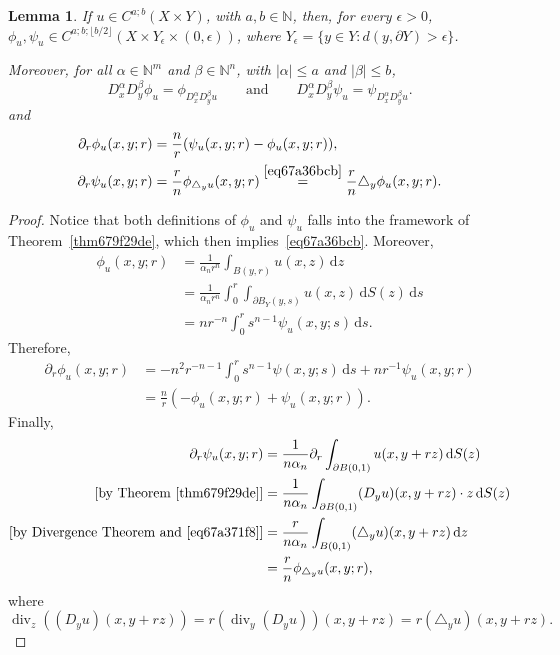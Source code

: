 \documentclass[a4paper,9pt]{amsart}
\newcommand{\N}{\mathbb{N}}	%
\newcommand{\did}{\,\mathrm{d}}	%
\newcommand{\de}{\partial}		%
\renewcommand{\div}{\operatorname{div}}	%
\newcommand{\laplacian}{\triangle}
\def\Xint#1{\mathchoice
      {\XXint\displaystyle\textstyle{#1}}%
      {\XXint\textstyle\scriptstyle{#1}}%
      {\XXint\scriptstyle\scriptscriptstyle{#1}}%
      {\XXint\scriptscriptstyle\scriptscriptstyle{#1}}%
      \!\int}
\def\XXint#1#2#3{{\setbox0=\hbox{$#1{#2#3}{\int}$}
        \vcenter{\hbox{$#2#3$}}\kern-.5\wd0}}
\def\fint{\Xint-}
\theoremstyle{plain}
\newtheorem{lemma}[proposition]{Lemma}
\theoremstyle{definition}
\theoremstyle{remark}
\begin{document}
\begin{lemma}\label{lem67cd4b64}
	If $u\in C^{a;b}(X\times Y)$, with $a,b\in\N$, then, for every $\epsilon>0$,
	$\phi_u,\psi_u \in C^{a;b;\lfloor b/2 \rfloor}(X\times Y_\epsilon\times(0,\epsilon))$,
	where $Y_\epsilon = \{y\in Y: d(y,\de Y)>\epsilon\}$.
	
	Moreover, for all $\alpha\in\N^m$ and $\beta\in\N^n$, with $|\alpha|\le a$ and $|\beta|\le b$,
	\begin{equation}\label{eq67a36bcb}
		D_x^\alpha D_y^\beta \phi_u 
		= \phi_{D_x^\alpha D_y^\beta u}
		\qquad\text{and}\qquad
		D_x^\alpha D_y^\beta \psi_u 
		= \psi_{D_x^\alpha D_y^\beta u} .
	\end{equation}
	and
	\begin{equation}\label{eq67bacb9a}
	\begin{aligned}
		\de_r\phi_u(x,y;r) &= \frac{n}{r} (\psi_u(x,y;r)- \phi_u(x,y;r) ) , \\
		\de_r\psi_u(x,y;r) &= \frac{r}{n} \phi_{\laplacian_yu}(x,y;r) 
			\overset{\eqref{eq67a36bcb}}= \frac{r}{n} \laplacian_y\phi_{u}(x,y;r) .
	\end{aligned}
	\end{equation}
\end{lemma}
\begin{proof}
	Notice that both definitions of $\phi_u$ and $\psi_u$ falls into the framework of Theorem~\ref{thm679f29de}, which then implies~\eqref{eq67a36bcb}.
	Moreover,
	\begin{align*}
		\phi_u(x,y;r) 
		&= \frac{1}{\alpha_nr^n} \int_{B(y,r)} u(x,z) \did z \\
		&= \frac{1}{\alpha_nr^n} \int_0^r \int_{\de B_Y(y,s)} u(x,z) \did S(z) \did s \\
		&= nr^{-n} \int_0^r s^{n-1} \psi_u(x,y;s) \did s .
	\end{align*} 
	Therefore,
	\begin{align*}
		\de_r\phi_u(x,y;r)
		&= -n^2 r^{-n-1} \int_0^r s^{n-1} \psi(x,y;s) \did s
			+ nr^{-1} \psi_u(x,y;r) \\
		&= \frac{n}{r} (- \phi_u(x,y;r) + \psi_u(x,y;r)) .
	\end{align*}
	Finally,
	\begin{align*}
		\de_r\psi_u(x,y;r)
		&= \frac1{n\alpha_n}  \de_r \int_{\de B(0,1)} u(x,y+rz) \did S(z) \\
		[\text{by Theorem~\ref{thm679f29de}}]
		&= \frac1{n\alpha_n} \int_{\de B(0,1)} (D_yu)(x,y+rz) \cdot z \did S(z) \\
		[\text{by Divergence Theorem and~\eqref{eq67a371f8}}]
		&= \frac{r}{n\alpha_n} \int_{B(0,1)} (\laplacian_yu)(x,y+rz) \did z \\
		&= \frac{r}{n} \phi_{\laplacian_yu}(x,y;r) ,
	\end{align*}
	where
	\begin{equation}\label{eq67a371f8}
	\div_z((D_yu)(x,y+rz)) 
	= r(\div_y(D_yu))(x,y+rz)
	= r(\laplacian_yu)(x,y+rz) .
	\end{equation}
\end{proof}
\end{document}
